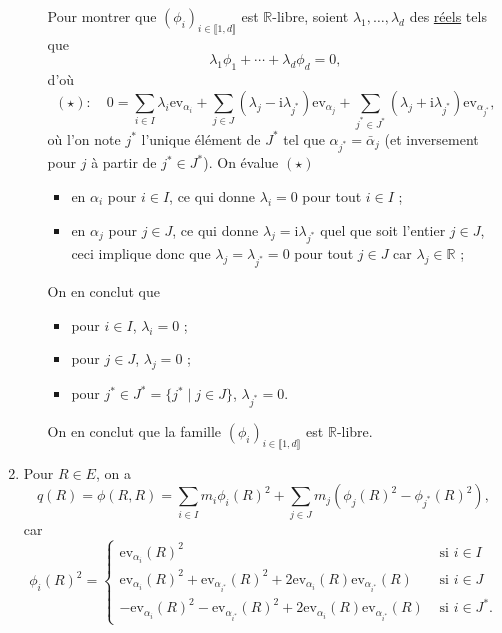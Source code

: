 \documentclass{../../td}
\begin{document}
\begin{enumerate}
\begin{enumerate}
          Pour montrer que $(\phi_i)_{i \in \llbracket 1,d\rrbracket  }$ est $\mathds{R}$-libre, soient $\lambda_1, \ldots, \lambda_d$ des \underline{réels} tels que \[
            \lambda_1 \phi_1 + \cdots + \lambda_d \phi_d = 0
          ,\]
          d'où{
            \footnotesize
            \[
            (\star) : \quad 0 = \sum_{i \in I} \lambda_i \mathrm{ev}_{\alpha_i} + \sum_{j \in J} (\lambda_j - \mathrm{i} \lambda_{j^*}) \mathrm{ev}_{\alpha_j}
            + \sum_{j^* \in J^*} (\lambda_j + \mathrm{i} \lambda_{j^*}) \mathrm{ev}_{\alpha_{j^*}}
            ,\] 
          }
          où l'on note $j^*$ l'unique élément de $J^*$ tel que $\alpha_{j^*} = \bar{\alpha}_j$ (et inversement pour $j$ à partir de $j^* \in J^*$).
          On évalue $(\star)$
           \begin{itemize}
             \item en $\alpha_i$ pour $i \in I$, ce qui donne $\lambda_i = 0$ pour tout $i \in I$ ;
             \item en $\alpha_j$ pour $j \in J$, ce qui donne $\lambda_j = \mathrm{i} \lambda_{j^*}$ quel que soit l'entier $j \in J$, ceci implique donc que $\lambda_j = \lambda_{j^*} = 0$ pour tout $j \in J$ car $\lambda_j \in \mathds{R}$ ;
          \end{itemize}
          On en conclut que 
          \begin{itemize}
            \item pour  $i \in I$, $\lambda_i = 0$ ;
            \item pour  $j \in J$, $\lambda_j = 0$ ;
            \item pour $j^* \in  J^* = \{j^*  \mid j \in J\}$, $\lambda_{j^*} = 0$.
          \end{itemize}
          On en conclut que la famille $(\phi_i)_{i \in \llbracket 1,d\rrbracket}$ est $\mathds{R}$-libre.
      \end{enumerate}
    \item
      Pour $R \in E$, on a
      \begin{equation}
      q(R) = \phi(R,R) = \sum_{i \in I} m_i \phi_i(R)^2
      + \sum_{j \in J} m_j (\phi_j(R)^2 - \phi_{j^*}(R)^2)
      \label{ex1-q3-eq1},
      \end{equation}
      car \[
      \phi_i(R)^2 = \begin{cases}
        \mathrm{ev}_{\alpha_i}(R)^2 &\text{ si } i \in I\\
        \mathrm{ev}_{\alpha_i}(R)^2 + \mathrm{ev}_{\alpha_{i^*}}(R)^2 + 2\mathrm{ev}_{\alpha_i}(R) \mathrm{ev}_{\alpha_{i^*}}(R) &\text{ si } i \in J\\
        -\mathrm{ev}_{\alpha_i}(R)^2 - \mathrm{ev}_{\alpha_{i^*}}(R)^2 + 2\mathrm{ev}_{\alpha_i}(R) \mathrm{ev}_{\alpha_{i^*}}(R) &\text{ si } i \in J^*.
      \end{cases}
      \]


\end{enumerate}
\end{document}
